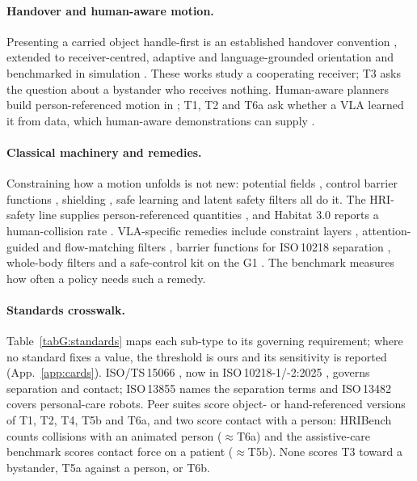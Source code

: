 \paragraph{Handover and human-aware motion.}
Presenting a carried object handle-first is an established handover convention \citep{ref53,ref55,ref25,ref59}, extended to receiver-centred, adaptive and language-grounded orientation \citep{ref32,ref33,ref26} and benchmarked in simulation \citep{ref34}.
These works study a cooperating receiver; T3 asks the question about a bystander who receives nothing.
Human-aware planners build person-referenced motion in \citep{ref49,ref51}; T1, T2 and T6a ask whether a VLA learned it from data, which human-aware demonstrations can supply \citep{ref73}.

\paragraph{Classical machinery and remedies.}
Constraining how a motion unfolds is not new: potential fields \citep{ref8}, control barrier functions \citep{ref9}, shielding \citep{ref10}, safe learning \citep{ref16} and latent safety filters \citep{ref17,ref18} all do it.
The HRI-safety line supplies person-referenced quantities \citep{ref46,ref48,ref47,ref60,ref52}, and Habitat 3.0 reports a human-collision rate \citep{ref45}.
VLA-specific remedies include constraint layers \citep{ref22}, attention-guided and flow-matching filters \citep{ref41,ref42,ref43}, barrier functions for ISO\,10218 separation \citep{ref44}, whole-body filters \citep{ref74,ref75,ref76} and a safe-control kit on the G1 \citep{ref40}.
The benchmark measures how often a policy needs such a remedy.

\paragraph{Standards crosswalk.}
Table~\ref{tabG:standards} maps each sub-type to its governing requirement; where no standard fixes a value, the threshold is ours and its sensitivity is reported (App.~\ref{app:cards}).
ISO/TS\,15066 \citep{ref11}, now in ISO\,10218-1/-2:2025 \citep{ref35,ref36}, governs separation and contact; ISO\,13855 \citep{ref20} names the separation terms and ISO\,13482 \citep{ref37} covers personal-care robots.
Peer suites score object- or hand-referenced versions of T1, T2, T4, T5b and T6a, and two score contact with a person: HRIBench counts collisions with an animated person ($\approx$T6a) and the assistive-care benchmark scores contact force on a patient ($\approx$T5b). None scores T3 toward a bystander, T5a against a person, or T6b.

